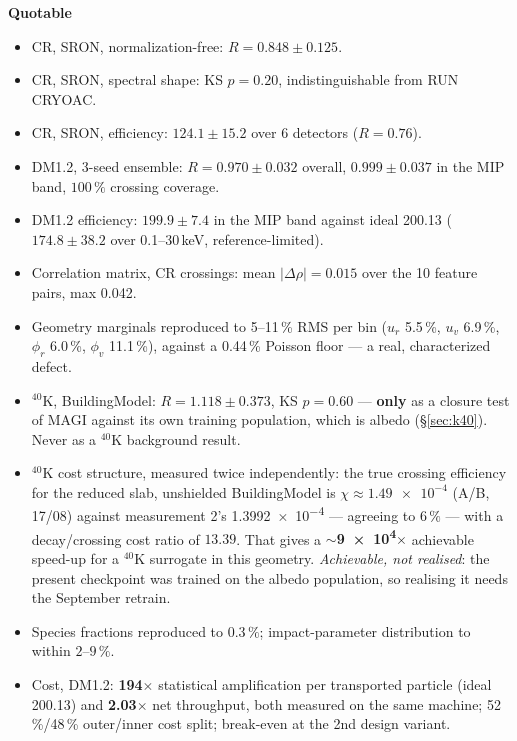 \documentclass[11pt,a4paper]{article}
\newenvironment{callout}[3]%
{\par\medskip\noindent
 \def\calloutframe{#1}\def\calloutback{#2}%
 \setlength{\fboxrule}{0.9pt}\setlength{\fboxsep}{8pt}%
 \begin{lrbox}{\calloutbox}%
 \begin{minipage}{\dimexpr\textwidth-2\fboxsep-2\fboxrule\relax}%
 \setlength{\parskip}{4pt}%
 \textcolor{#1}{\textbf{#3}}\par\nobreak\smallskip}
{\end{minipage}\end{lrbox}%
 \fcolorbox{\calloutframe}{\calloutback}{\usebox{\calloutbox}}%
 \par\medskip}
\begin{document}
\begin{callout}{ok}{green!4}{Quotable}
\begin{itemize}[nosep]
  \item CR, SRON, normalization-free: $R = 0.848 \pm 0.125$.
  \item CR, SRON, spectral shape: KS $p = 0.20$, indistinguishable from RUN CRYOAC.
  \item CR, SRON, efficiency: $124.1 \pm 15.2$ over 6 detectors ($R = 0.76$).
  \item DM1.2, 3-seed ensemble: $R = 0.970 \pm 0.032$ overall,
        $0.999 \pm 0.037$ in the MIP band, $100\,\%$ crossing coverage.
  \item DM1.2 efficiency: $199.9 \pm 7.4$ in the MIP band against ideal
        200.13 ($174.8 \pm 38.2$ over 0.1--30\,keV, reference-limited).
  \item Correlation matrix, CR crossings: mean $|\Delta\rho| = 0.015$ over the
        10 feature pairs, max 0.042.
  \item Geometry marginals reproduced to 5--11\,\% RMS per bin
        ($u_r$ 5.5\,\%, $u_v$ 6.9\,\%, $\phi_r$ 6.0\,\%, $\phi_v$ 11.1\,\%),
        against a 0.44\,\% Poisson floor --- a real, characterized defect.
  \item $^{40}$K, BuildingModel: $R = 1.118 \pm 0.373$, KS $p = 0.60$ ---
        \textbf{only} as a closure test of MAGI against its own training
        population, which is albedo (\S\ref{sec:k40}). Never as a $^{40}$K
        background result.
  \item $^{40}$K cost structure, measured twice independently: the true
        crossing efficiency for the reduced slab, unshielded BuildingModel is
        $\chi \approx \num{1.49e-4}$ (A/B, 17/08) against measurement 2's
        \num{1.3992e-4} --- agreeing to $6\,\%$ --- with a decay/crossing cost
        ratio of $13.39$. That gives a \textbf{$\sim$\num{9e4}$\times$}
        achievable speed-up for a $^{40}$K surrogate in this geometry.
        \emph{Achievable, not realised}: the present checkpoint was trained on
        the albedo population, so realising it needs the September retrain.
  \item Species fractions reproduced to $0.3\,\%$; impact-parameter
        distribution to within $2$--$9\,\%$.
  \item Cost, DM1.2: \textbf{194$\times$} statistical amplification per
        transported particle (ideal 200.13) and \textbf{2.03$\times$} net
        throughput, both measured on the same machine; 52\,\%/48\,\%
        outer/inner cost split; break-even at the 2nd design variant.

\end{itemize}
\end{callout}
\end{document}
